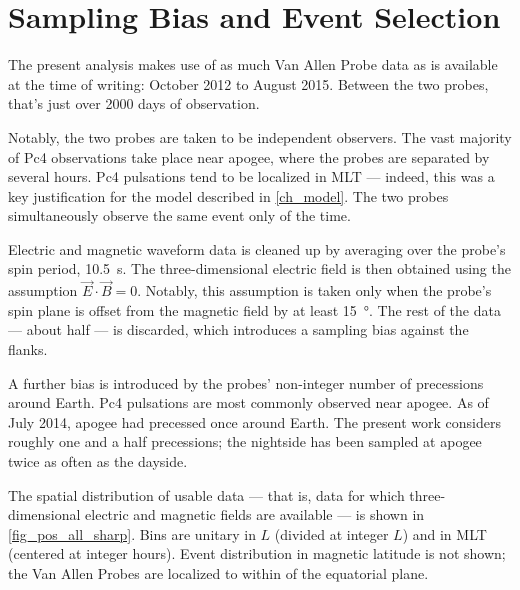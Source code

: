 \section{Sampling Bias and Event Selection}
  \label{sec_selection}

The present analysis makes use of as much Van Allen Probe data as is available at the time of writing: October 2012 to August 2015. Between the two probes, that's just over 2000 days of observation. 

Notably, the two probes are taken to be independent observers. The vast majority of Pc4 observations take place near apogee, where the probes are separated by several hours. Pc4 pulsations tend to be localized in MLT --- indeed, this was a key justification for the model described in \cref{ch_model}. The two probes simultaneously observe the same event only \todo{$\cdots$} of the time. 


Electric and magnetic waveform data is cleaned up by averaging over the probe's spin period, \SI{10.5}{\s}. The three-dimensional electric field is then obtained using the assumption $\vec{E} \cdot \vec{B} = 0$. Notably, this assumption is taken only when the probe's spin plane is offset from the magnetic field by at least \SI{15}{\degree}. The rest of the data --- about half --- is discarded, which introduces a sampling bias against the flanks. 

A further bias is introduced by the probes' non-integer number of precessions around Earth. Pc4 pulsations are most commonly observed near apogee. As of July 2014, apogee had precessed once around Earth\cite{dai_2015}. The present work considers roughly one and a half precessions; the nightside has been sampled at apogee twice as often as the dayside. 

The spatial distribution of usable data --- that is, data for which three-dimensional electric and magnetic fields are available --- is shown in \cref{fig_pos_all_sharp}. Bins are unitary in $L$ (divided at integer $L$) and in MLT (centered at integer hours). Event distribution in magnetic latitude is not shown; the Van Allen Probes are localized to within  of the equatorial plane. 

